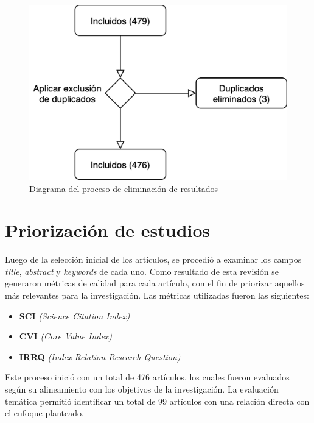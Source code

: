 \begin{figure}[H]
	\centering
	\includegraphics[scale=0.25] {tablas-images/sms/eliminacion-duplicados.png}
	\caption{Diagrama del proceso de eliminación de resultados}\label{fig:eliminacion-duplicados}
\end{figure}


\section{Priorización de estudios}\label{sec:priorizacionEstudios}
\noindent


Luego de la selección inicial de los artículos, se procedió a examinar los campos  \textit{title}, \textit{abstract} y \textit{keywords} de cada uno. Como resultado de esta revisión se generaron métricas de calidad para cada artículo, con el fin de priorizar aquellos más relevantes para la investigación. Las métricas utilizadas fueron las siguientes:

\begin{itemize}
	\item \textbf{SCI} \textit{(Science Citation Index)}
	\item \textbf{CVI} \textit{(Core Value Index)}
	\item \textbf{IRRQ} \textit{(Index Relation Research Question)}
\end{itemize}
\noindent

Este proceso inició con un total de 476 artículos, los cuales fueron evaluados según su alineamiento con los objetivos de la investigación. La evaluación temática permitió identificar un total de 99 artículos con una relación directa con el enfoque planteado.

